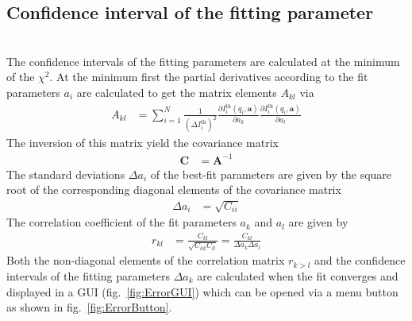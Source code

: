 \subsection{Confidence interval of the fitting parameter}
~\\

The confidence intervals of the fitting parameters are calculated at the minimum of the $\chi^2$. At the minimum first the partial derivatives according to the fit parameters $a_i$ are calculated to get the matrix elements $A_{kl}$ via
\begin{align}
A_{kl} &= \sum_{i=1}^{N} \frac{1}{\left(\Delta I_i^\mathrm{th}\right)^2} \frac{\partial I_i^\mathrm{th}(q_i,\mathbf{a})}{\partial a_k} \frac{\partial I_i^\mathrm{th}(q_i,\mathbf{a})}{\partial a_l}
\end{align}
The inversion of this matrix yield the covariance matrix
\begin{align}
        \mathbf{C} &= \mathbf{A}^{-1}
\end{align}
The standard deviations $\Delta a_i$ of the best-fit parameters are given by the square root of the corresponding diagonal elements of the covariance matrix
\begin{align}
\Delta a_i &= \sqrt{C_{ii}}
\end{align}
The correlation coefficient of the fit parameters $a_k$ and $a_l$ are given by
\begin{align}
r_{kl} &= \frac{C_{kl}}{\sqrt{C_{kk}C_{ll}}} = \frac{C_{kl}}{\Delta a_k \Delta a_l}
\end{align}
Both the non-diagonal elements of the correlation matrix $r_{k>l}$ and the confidence intervals of the fitting parameters $\Delta a_k$ are calculated when the fit converges and displayed in a GUI (fig.\ \ref{fig:ErrorGUI}) which can be opened via a menu button as shown in fig.\ \ref{fig:ErrorButton}.

